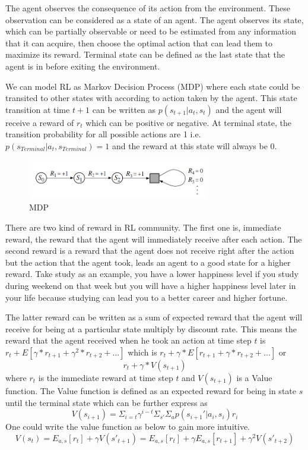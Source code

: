 \documentclass{article}
\begin{document}
The agent observes the consequence of its action from the environment. These observation can be considered as a state of an agent. The agent observes its state, which can be partially observable or need to be estimated from any information that it can acquire, then choose the optimal action that can lead them to maximize its reward. Terminal state can be defined as the last state that the agent is in before exiting the environment.    

We can model RL as Markov Decision Process (MDP) where each state could be transited to other states with according to action taken by the agent. This state transition at time $t+1$ can be written as $p(s_{t+1}|{a_t},{s_t})$ and the agent will receive a reward of $r_t$ which can be positive or negative. At terminal state, the transition probability for all possible actions are 1 i.e. $p(s_{Terminal}|{a_t},s_{Terminal}) = 1$ and the reward at this state will always be $0$.

\begin{figure}[h]
\includegraphics[width=8cm]{./pic/introduction/MDP}
\centering
\caption{MDP}
\end{figure}

There are two kind of reward in RL community. The first one is, immediate reward, the reward that the agent will immediately receive after each action. The second reward is a reward that the agent does not receive right after the action but the action that the agent took, leads an agent to a good state for a higher reward. Take study as an example, you have a lower happiness level if you study during weekend on that week but you will have a higher happiness level later in your life because studying can lead you to a better career and higher fortune. 


The latter reward can be written as a sum of expected reward that the agent will receive for being at a particular state multiply by discount rate. This means the reward that the agent received when he took an action at time step $t$ is $r_t + E[\gamma*r_{t+1}+\gamma^2*r_{t+2}+ ...]$ which is $r_t + \gamma*E[r_{t+1}+\gamma*r_{t+2}+ ...]$ or $$r_t + \gamma*V(s_{t+1})$$ where $r_t$ is the immediate reward at time step $t$ and $V(s_{t+1})$ is a Value function. The Value function is defined as an expected reward for being in state $s$ until the terminal state which can be further express as $$ V(s_{i+1}) = \Sigma_{i=t} \gamma^{i-t} \Sigma_{s'} \Sigma_a p(s_{i+1}'|a_{i},s_i)r_{i}  $$
One could write the value function as below to gain more intuitive. $$  V(s_t) = E_{a,s}[r_t] + \gamma V(s'_{t+1})  = E_{a,s}[r_t] + \gamma E_{a,s}[r_{t+1}] +\gamma^2 V(s'_{t+2})$$
\end{document}
